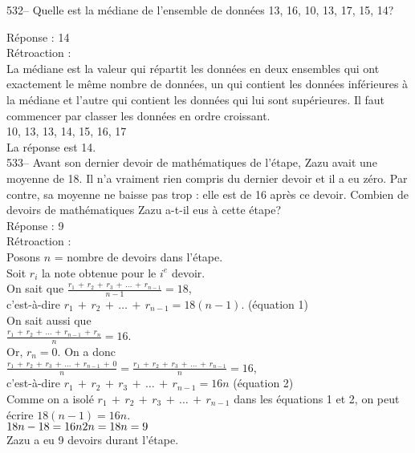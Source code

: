 ﻿\documentclass[letterpaper, 12pt]{article}
\begin{document}
532-- Quelle est la m\'ediane de l'ensemble de donn\'ees 13, 16, 10, 13, 17,
15, 14?

R\'eponse : 14\\

R\'etroaction :\\
La m\'ediane est la valeur qui r\'epartit les donn\'ees en deux ensembles
qui ont exactement le m\^eme nombre de donn\'ees, un qui contient les
donn\'ees inf\'erieures \`a la m\'ediane et l'autre qui contient les
donn\'ees qui lui sont sup\'erieures.  Il faut commencer par classer les
donn\'ees en ordre croissant.\\
10, 13, 13, 14, 15, 16, 17 \\
La r\'eponse est 14.\\

533-- Avant son dernier devoir de math\'ematiques de l'\'etape, Zazu avait
une moyenne de 18.  Il n'a vraiment rien compris du dernier devoir et il a
eu z\'ero.  Par contre, sa moyenne ne baisse pas trop : elle est de 16
apr\`es ce devoir.  Combien de devoirs de math\'ematiques Zazu a-t-il eus
\`a cette \'etape?\\

R\'eponse : 9\\

R\'etroaction : \\
Posons $n$ = nombre de devoirs dans l'\'etape.\\
Soit $r_i$ la note obtenue pour le $i^{e}$ devoir.\\[2mm]
On sait que
$\frac{r_{1}\,+\,r_{2}\,+\,r_{3}\,+\,\ldots\,+\,r_{n-1}}{n-1}=18$,\\[2mm]
c'est-\`a-dire $r_{1}\,+\,r_{2}\,+\,\ldots\,+\,r_{n-1} =18(n-1)$. \qquad
(\'equation 1)\\[2mm]
On sait aussi que \\[2mm]
$\frac{r_{1}\,+\,r_{2}\,+\,\ldots\,+\,r_{n-1}\,+\,r_{n}}{n}=16$.\\[2mm]
Or, $r_{n}=0$.  On a donc \\[2mm]
$\frac{r_{1}\,+\,r_{2}\,+\,r_{3}\,+\,\ldots\,+\,r_{n-1}\,+\,0}{n}=\frac{r_{1}\,+\,r_{2}\,+\,r_{3}\,+\,\ldots\,+\,r_{n-1}}{n}=16$,\\[2mm]
c'est-\`a-dire $r_{1}\,+\,r_{2}\,+\,r_{3}\,+\,\ldots\,+\,r_{n-1}=16n$ \qquad
(\'equation 2)\\[2mm]
Comme on a isol\'e
$r_{1}\,+\,r_{2}\,+\,r_{3}\,+\,\ldots\,+\,r_{n-1}$ dans les
\'equations 1 et 2,
on peut \'ecrire $18\left( n-1\right) = 16n$.\\
$18n-18=16n\\
2n=18\\
n=9$\\
Zazu a eu 9 devoirs durant l'\'etape.\\
\end{document}
